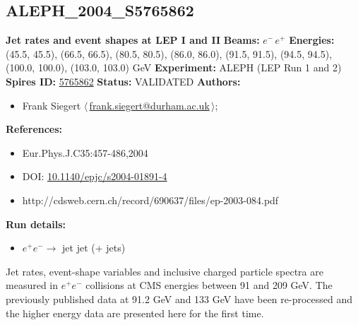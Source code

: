 \subsection[ALEPH\_2004\_S5765862]{ALEPH\_2004\_S5765862\,\cite{Heister:2003aj}}
\textbf{Jet rates and event shapes at LEP I and II}\newline
\textbf{Beams:} $e^-$\,$e^+$ \newline
\textbf{Energies:} (45.5, 45.5), (66.5, 66.5), (80.5, 80.5), (86.0, 86.0), (91.5, 91.5), (94.5, 94.5), (100.0, 100.0), (103.0, 103.0) GeV \newline
\textbf{Experiment:} ALEPH (LEP Run 1 and 2) \newline
\textbf{Spires ID:} \href{http://www.slac.stanford.edu/spires/find/hep/www?rawcmd=key+5765862}{5765862}\newline
\textbf{Status:} VALIDATED\newline
\textbf{Authors:}
\begin{itemize}
  \item Frank Siegert $\langle\,$\href{mailto:frank.siegert@durham.ac.uk}{frank.siegert@durham.ac.uk}$\,\rangle$;
\end{itemize}
\textbf{References:}
\begin{itemize}
  \item Eur.Phys.J.C35:457-486,2004
  \item DOI: \href{http://dx.doi.org/10.1140/epjc/s2004-01891-4}{10.1140/epjc/s2004-01891-4}
  \item http://cdsweb.cern.ch/record/690637/files/ep-2003-084.pdf
\end{itemize}
\textbf{Run details:}
\begin{itemize}

  \item $e^+ e^- \to$ jet jet (+ jets)\end{itemize}

\noindent Jet rates, event-shape variables and inclusive charged particle spectra are measured in $e^+ e^-$ collisions at CMS energies between 91 and 209 GeV. The previously published data at 91.2 GeV and 133 GeV have been re-processed and the higher energy data are presented here for the first time.

\clearpage


\clearpage

